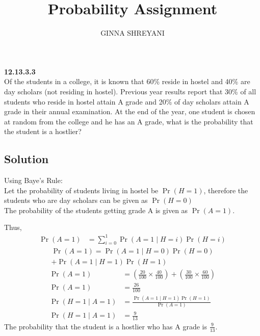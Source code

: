 \documentclass[12pt,twocolumn]{article}
\title{
Probability Assignment
}
\author{GINNA SHREYANI}
\date{}
\providecommand{\pr}[1]{\ensuremath{\Pr\left(#1\right)}}
\begin{document}
\maketitle

\textbf{12.13.3.3}\\
Of the students in a college, it is known that 60\% reside in hostel and 40\% are day scholars (not residing in hostel). Previous year results report that 30\% of all students who reside in hostel attain A grade and 20\% of day scholars attain A grade in their annual examination. At the end of the year, one student is chosen at random from the college and he has an A grade, what is the probability that the student is a hostlier?
\subsection*{Solution}
Using Baye's Rule:\\
Let the probability of students living in hostel be $\pr{H=1}$, therefore the students who are day scholars can be given as $\pr{H=0}$\\
The probability of the students getting grade A is given as $\pr{A=1}$.\\

\begin{table}
	
\end{table}

\begin{table}
        
\end{table}

Thus,
\begin{align}
	\pr{A=1} &= \sum_{i=0}^1 \pr{A = 1 \mid H = i}\pr{H=i}
\end{align}
\begin{multline}
	\pr{A=1} = \pr{A = 1 \mid H = 0}\pr{H = 0}\\
	+\pr{A = 1 \mid H = 1}\pr{H = 1}
\end{multline}
\begin{align}
	\pr{A=1} &= \left(\frac{20}{100} \times \frac{40}{100}\right)+\left(\frac{30}{100} \times \frac{60}{100}\right)\\
	\pr{A=1} &= \frac{26}{100}\\
	\pr{H=1 \mid A=1} &= \frac{\pr{A=1 \mid H=1}\pr{H=1}}{\pr{A=1}}\\
	\pr{H=1 \mid A=1} &= \frac{9}{13}
\end{align}
The probability that the student is a hostlier who has A grade is $\frac{9}{13}$.
\end{document}
